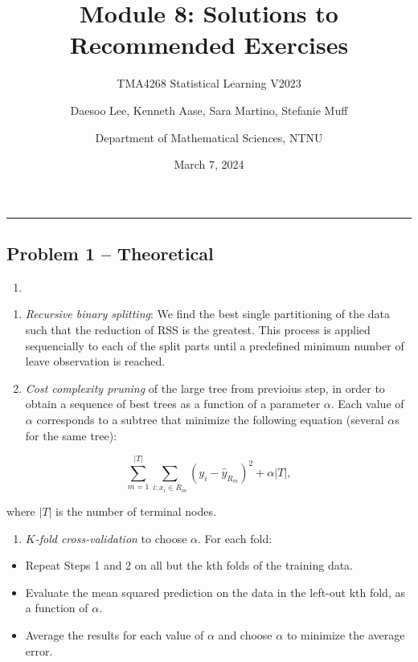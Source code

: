 \documentclass[
]{article}
\title{Module 8: Solutions to Recommended Exercises}
\subtitle{TMA4268 Statistical Learning V2023}
\author{Daesoo Lee, Kenneth Aase, Sara Martino, Stefanie
Muff \and Department of Mathematical Sciences, NTNU}
\date{March 7, 2024}
\providecommand{\tightlist}{%
  \setlength{\itemsep}{0pt}\setlength{\parskip}{0pt}}
\begin{document}
\maketitle

\begin{center}\rule{0.5\linewidth}{0.5pt}\end{center}

\hypertarget{problem-1-theoretical}{%
\subsection{Problem 1 -- Theoretical}\label{problem-1-theoretical}}

\begin{enumerate}
\def\labelenumi{\alph{enumi})}
\tightlist
\item
\end{enumerate}

\begin{enumerate}
\def\labelenumi{\arabic{enumi}.}
\item
  \emph{Recursive binary splitting}: We find the best single
  partitioning of the data such that the reduction of RSS is the
  greatest. This process is applied sequencially to each of the split
  parts until a predefined minimum number of leave observation is
  reached.
\item
  \emph{Cost complexity pruning} of the large tree from previoius step,
  in order to obtain a sequence of best trees as a function of a
  parameter \(\alpha\). Each value of \(\alpha\) corresponds to a
  subtree that minimize the following equation (several \(\alpha\)s for
  the same tree):
\end{enumerate}

\[\sum_{m=1}^{|T|}\sum_{i:x_i\in R_m}(y_i - \hat y_{R_m})^2 + \alpha |T|,\]

where \(|T|\) is the number of terminal nodes.

\begin{enumerate}
\def\labelenumi{\arabic{enumi}.}
\setcounter{enumi}{2}
\tightlist
\item
  \emph{\(K\)-fold cross-validation} to choose \(\alpha\). For each
  fold:
\end{enumerate}

\begin{itemize}
\tightlist
\item
  Repeat Steps 1 and 2 on all but the kth folds of the training data.
\item
  Evaluate the mean squared prediction on the data in the left-out kth
  fold, as a function of \(\alpha\).
\item
  Average the results for each value of \(\alpha\) and choose \(\alpha\)
  to minimize the average error.
\end{itemize}
\end{document}

